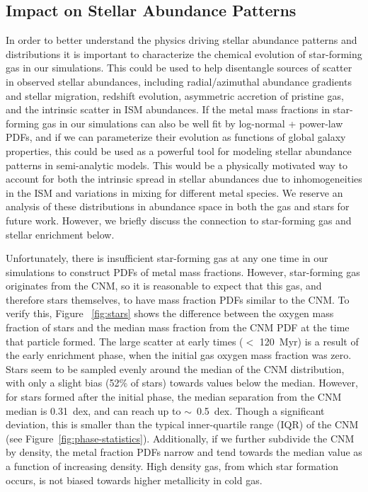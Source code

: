 \subsection{Impact on Stellar Abundance Patterns}
\label{sec:stellar abundances}
In order to better understand the physics driving stellar abundance patterns and distributions it is important to characterize the chemical evolution of star-forming gas in our simulations. This could be used to help disentangle sources of scatter in observed stellar abundances, including radial/azimuthal abundance gradients and stellar migration, redshift evolution, asymmetric accretion of pristine gas, and the intrinsic scatter in ISM abundances. If the metal mass fractions in star-forming gas in our simulations can also be well fit by log-normal + power-law PDFs, and if we can parameterize their evolution as functions of global galaxy properties, this could be used as a powerful tool for modeling stellar abundance patterns in semi-analytic models. This would be a physically motivated way to account for both the intrinsic spread in stellar abundances due to inhomogeneities in the ISM and variations in mixing for different metal species. We reserve an analysis of these distributions in abundance space in both the gas and stars for future work. However, we briefly discuss the connection to star-forming gas and stellar enrichment below.

Unfortunately, there is insufficient star-forming gas at any one time in our simulations to construct PDFs of metal mass fractions. However, star-forming gas originates from the CNM, so it is reasonable to expect that this gas, and therefore stars themselves, to have mass fraction PDFs similar to the CNM. To verify this, Figure ~\ref{fig:stars} shows the difference between the oxygen mass fraction of stars and the median mass fraction from the CNM PDF at the time that particle formed. The large scatter at early times ($<$ 120~Myr) is a result of the early enrichment phase, when the initial gas oxygen mass fraction was zero. Stars seem to be sampled evenly around the median of the CNM distribution, with only a slight bias (52\% of stars) towards values below the median. However, for stars formed after the initial phase, the median separation from the CNM median is 0.31~dex, and can reach up to $\sim$~0.5~dex. Though a significant deviation, this is smaller than the typical inner-quartile range (IQR) of the CNM (see Figure~\ref{fig:phase-statistics}). Additionally, if we further subdivide the CNM by density, the metal fraction PDFs narrow and tend towards the median value as a function of increasing density. High density gas, from which star formation occurs, is not biased towards higher metallicity in cold gas.

